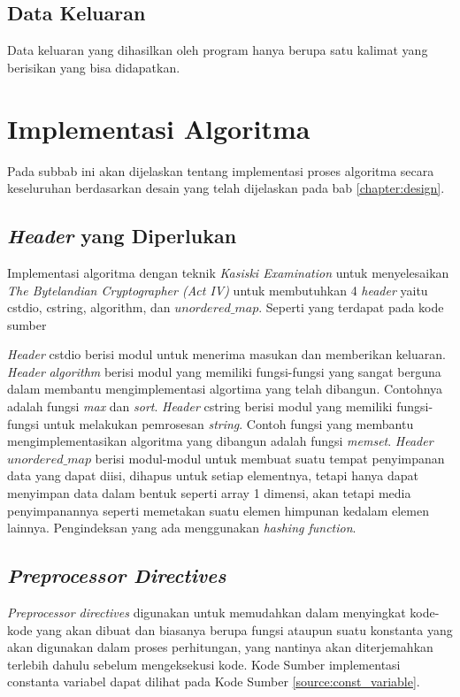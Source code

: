 \subsection{Data Keluaran}
Data keluaran yang dihasilkan oleh program hanya berupa satu kalimat yang berisikan \plaintext yang bisa didapatkan.

\section{Implementasi Algoritma}
Pada subbab ini akan dijelaskan tentang implementasi proses
algoritma secara keseluruhan berdasarkan desain yang telah
dijelaskan pada bab \ref{chapter:design}.

\subsection{\textit{Header} yang Diperlukan}
Implementasi algoritma dengan teknik \textit{Kasiski Examination} untuk menyelesaikan \textit{The Bytelandian Cryptographer (Act IV)} untuk membutuhkan 4 \textit{header} yaitu cstdio, cstring, algorithm, dan $unordered\_map$. Seperti yang terdapat pada kode sumber



\textit{Header} cstdio berisi modul untuk menerima masukan dan
memberikan keluaran. \textit{Header} \textit{algorithm} berisi modul yang memiliki fungsi-fungsi yang sangat berguna dalam membantu mengimplementasi algortima yang telah dibangun. Contohnya adalah fungsi \textit{max} dan \textit{sort}. \textit{Header} cstring berisi modul yang memiliki fungsi-fungsi untuk melakukan pemrosesan \textit{string}. Contoh fungsi yang membantu mengimplementasikan algoritma yang dibangun adalah fungsi \textit{memset}. \textit{Header} \textit{$unordered\_map$} berisi modul-modul untuk membuat suatu tempat penyimpanan data yang dapat diisi, dihapus untuk setiap elementnya, tetapi hanya dapat menyimpan data dalam bentuk seperti array 1 dimensi, akan tetapi media penyimpanannya seperti memetakan suatu elemen himpunan kedalam elemen lainnya. Pengindeksan yang ada menggunakan \textit{hashing function}.

\subsection{\textit{Preprocessor Directives}}
\textit{Preprocessor directives} digunakan untuk memudahkan dalam menyingkat kode-kode yang akan dibuat dan biasanya berupa fungsi ataupun suatu konstanta yang akan digunakan dalam proses perhitungan, yang nantinya akan diterjemahkan terlebih dahulu sebelum mengeksekusi kode. Kode Sumber implementasi constanta variabel dapat dilihat pada Kode Sumber \ref{source:const_variable}.

